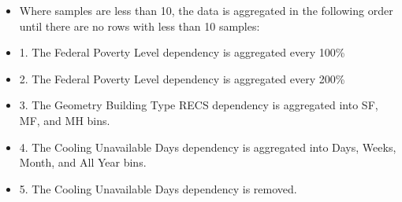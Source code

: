 \begin{itemize}
\item Where samples are less than 10, the data is aggregated in the following order until there are no rows with less than 10 samples:
\item 1. The Federal Poverty Level dependency is aggregated every 100\%
\item 2. The Federal Poverty Level dependency is aggregated every 200\%
\item 3. The Geometry Building Type RECS dependency is aggregated into SF, MF, and MH bins.
\item 4. The Cooling Unavailable Days dependency is aggregated into Days, Weeks, Month, and All Year bins.
\item 5. The Cooling Unavailable Days dependency is removed.
\end{itemize}
